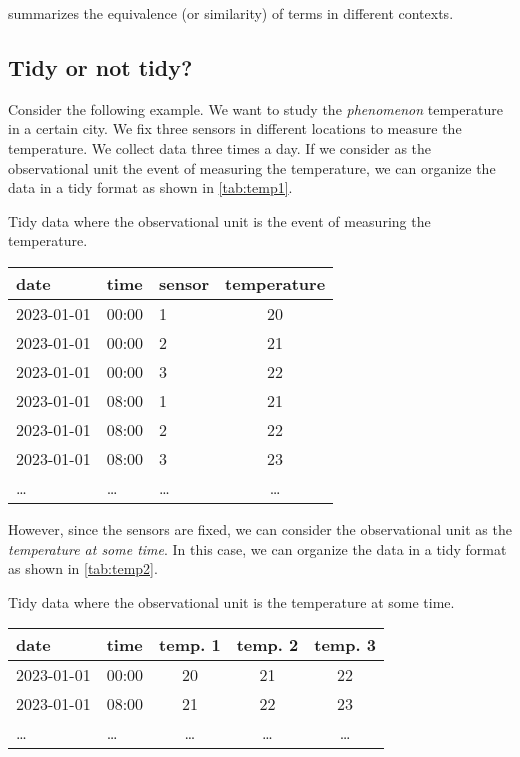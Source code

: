  summarizes the equivalence (or similarity) of terms in different
contexts.

\subsection{Tidy or not tidy?}

Consider the following example.  We want to study the \emph{phenomenon} temperature in a
certain city.  We fix three sensors in different locations to measure the temperature.  We
collect data three times a day.  If we consider as the observational unit the
event of measuring the temperature, we can organize the data in a tidy format as shown in
\cref{tab:temp1}.

\begin{tablebox}[label=tab:temp1]{Tidy data where the observational unit is the event of measuring the temperature.}
  \centering
  \begin{tabular}{lllc}
    \toprule
    date & time & sensor & temperature \\
    \midrule
    2023-01-01 & 00:00 & 1 & 20 \\
    2023-01-01 & 00:00 & 2 & 21 \\
    2023-01-01 & 00:00 & 3 & 22 \\
    2023-01-01 & 08:00 & 1 & 21 \\
    2023-01-01 & 08:00 & 2 & 22 \\
    2023-01-01 & 08:00 & 3 & 23 \\
    \dots & \dots & \dots & \dots \\
    \bottomrule
  \end{tabular}
\end{tablebox}

However, since the sensors are fixed, we can consider the observational unit as the
\emph{temperature at some time}.  In this case, we can organize the data in a tidy format
as shown in \cref{tab:temp2}.

\begin{tablebox}[label=tab:temp2]{Tidy data where the observational unit is the temperature at some time.}
  \centering
  \begin{tabular}{llccc}
    \toprule
    date & time & temp. 1 & temp. 2 & temp. 3 \\
    \midrule
    2023-01-01 & 00:00 & 20 & 21 & 22 \\
    2023-01-01 & 08:00 & 21 & 22 & 23 \\
    \dots & \dots & \dots & \dots & \dots \\
    \bottomrule
  \end{tabular}
\end{tablebox}

